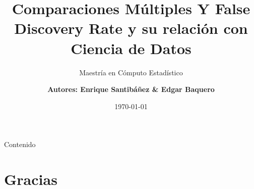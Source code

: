 

\title{Comparaciones Múltiples Y False Discovery Rate y su relación con Ciencia de Datos}
\subtitle{Maestría en Cómputo Estadístico}
\date{\today}
\author{\bf{Autores: } Enrique Santibáñez \& Edgar Baquero}
\usepackage{MnSymbol,wasysym}



  \maketitle




\begin{frame}{Contenido}
	\tableofcontents
\end{frame}







%

\section*{Gracias \blacksmiley{}}


